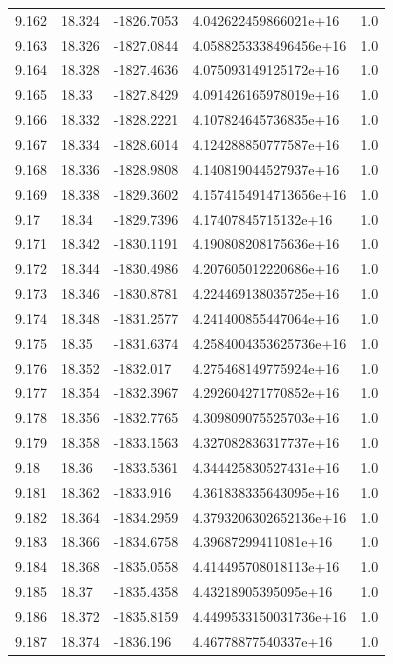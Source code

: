 \begin{tabular}{lllll}
9.162 & 18.324 & -1826.7053 & 4.042622459866021e+16 & 1.0 \\
9.163 & 18.326 & -1827.0844 & 4.0588253338496456e+16 & 1.0 \\
9.164 & 18.328 & -1827.4636 & 4.075093149125172e+16 & 1.0 \\
9.165 & 18.33 & -1827.8429 & 4.091426165978019e+16 & 1.0 \\
9.166 & 18.332 & -1828.2221 & 4.107824645736835e+16 & 1.0 \\
9.167 & 18.334 & -1828.6014 & 4.124288850777587e+16 & 1.0 \\
9.168 & 18.336 & -1828.9808 & 4.140819044527937e+16 & 1.0 \\
9.169 & 18.338 & -1829.3602 & 4.1574154914713656e+16 & 1.0 \\
9.17 & 18.34 & -1829.7396 & 4.17407845715132e+16 & 1.0 \\
9.171 & 18.342 & -1830.1191 & 4.190808208175636e+16 & 1.0 \\
9.172 & 18.344 & -1830.4986 & 4.207605012220686e+16 & 1.0 \\
9.173 & 18.346 & -1830.8781 & 4.224469138035725e+16 & 1.0 \\
9.174 & 18.348 & -1831.2577 & 4.241400855447064e+16 & 1.0 \\
9.175 & 18.35 & -1831.6374 & 4.2584004353625736e+16 & 1.0 \\
9.176 & 18.352 & -1832.017 & 4.275468149775924e+16 & 1.0 \\
9.177 & 18.354 & -1832.3967 & 4.292604271770852e+16 & 1.0 \\
9.178 & 18.356 & -1832.7765 & 4.309809075525703e+16 & 1.0 \\
9.179 & 18.358 & -1833.1563 & 4.327082836317737e+16 & 1.0 \\
9.18 & 18.36 & -1833.5361 & 4.344425830527431e+16 & 1.0 \\
9.181 & 18.362 & -1833.916 & 4.361838335643095e+16 & 1.0 \\
9.182 & 18.364 & -1834.2959 & 4.3793206302652136e+16 & 1.0 \\
9.183 & 18.366 & -1834.6758 & 4.39687299411081e+16 & 1.0 \\
9.184 & 18.368 & -1835.0558 & 4.414495708018113e+16 & 1.0 \\
9.185 & 18.37 & -1835.4358 & 4.43218905395095e+16 & 1.0 \\
9.186 & 18.372 & -1835.8159 & 4.4499533150031736e+16 & 1.0 \\
9.187 & 18.374 & -1836.196 & 4.46778877540337e+16 & 1.0 \\

\end{tabular}
